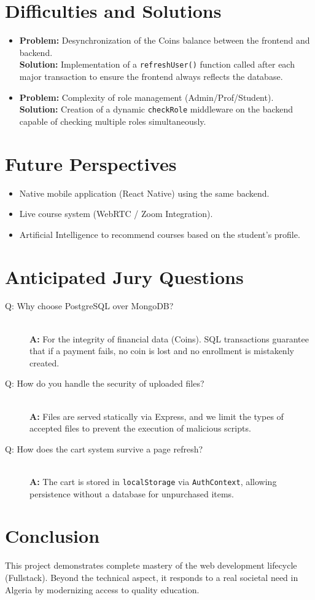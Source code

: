 \documentclass[12pt,a4paper]{article}
\begin{document}
\section{Difficulties and Solutions}
\begin{itemize}
    \item \textbf{Problem:} Desynchronization of the Coins balance between the frontend and backend. \\
    \textbf{Solution:} Implementation of a \texttt{refreshUser()} function called after each major transaction to ensure the frontend always reflects the database.
    \item \textbf{Problem:} Complexity of role management (Admin/Prof/Student). \\
    \textbf{Solution:} Creation of a dynamic \texttt{checkRole} middleware on the backend capable of checking multiple roles simultaneously.
\end{itemize}

\section{Future Perspectives}
\begin{itemize}[noitemsep]
    \item Native mobile application (React Native) using the same backend.
    \item Live course system (WebRTC / Zoom Integration).
    \item Artificial Intelligence to recommend courses based on the student's profile.
\end{itemize}

\section{Anticipated Jury Questions}
\begin{description}
    \item[Q: Why choose PostgreSQL over MongoDB?] \hfill \\
    \textbf{A:} For the integrity of financial data (Coins). SQL transactions guarantee that if a payment fails, no coin is lost and no enrollment is mistakenly created.
    
    \item[Q: How do you handle the security of uploaded files?] \hfill \\
    \textbf{A:} Files are served statically via Express, and we limit the types of accepted files to prevent the execution of malicious scripts.
    
    \item[Q: How does the cart system survive a page refresh?] \hfill \\
    \textbf{A:} The cart is stored in \texttt{localStorage} via \texttt{AuthContext}, allowing persistence without a database for unpurchased items.
\end{description}

\section{Conclusion}
This project demonstrates complete mastery of the web development lifecycle (Fullstack). Beyond the technical aspect, it responds to a real societal need in Algeria by modernizing access to quality education.
\end{document}
